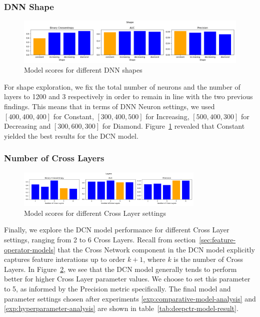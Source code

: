 \documentclass{mldsmsc}
\begin{document}
\subsubsection{DNN Shape}
\begin{figure}[h]
    \centering
    \includegraphics[width=\textwidth]{../figures/shape.png}
    \caption{Model scores for different DNN shapes}
    \label{fig:shape}
\end{figure}

For shape exploration, we fix the total number of neurons and the number of layers
to 1200 and 3 respectively in order to remain in line with the two previous findings.
This means that in terms of DNN Neuron settings, we used $[400,400,400]$ for Constant,
$[300,400,500]$ for Increasing, $[500,400,300]$ for Decreasing and $[300,600,300]$ for Diamond.
Figure~\ref{fig:shape} revealed that Constant yielded the best results for the
DCN model.

\subsubsection{Number of Cross Layers}
\begin{figure}[h]
    \centering
    \includegraphics[width=0.8\textwidth]{../figures/cross_layers.png}
    \caption{Model scores for different Cross Layer settings}
    \label{fig:cross-layers}
\end{figure}

Finally, we explore the DCN model performance for different Cross Layer settings, ranging
from 2 to 6 Cross Layers. Recall from section~\ref{sec:feature-operator-models} that
the Cross Network component in the DCN model explicitly captures feature interations
up to order $k+1$, where $k$ is the number of Cross Layers. In Figure~\ref{fig:cross-layers},
we see that the DCN model generally tends to perform better for higher Cross Layer parameter
values. We choose to set this parameter to 5, as informed by the Precision metric specifically.
The final model and parameter settings chosen after experiments \ref{exp:comparative-model-analysis}
and \ref{exp:hyperparameter-analysis} are shown in table~\ref{tab:deepctr-model-result}.
\end{document}

